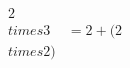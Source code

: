 \documentclass[preview]{standalone}
\begin{document}
\begin{align*}
2 \\times 3 &= 2 + (2 \\times 2) \\
\end{align*}
\end{document}
